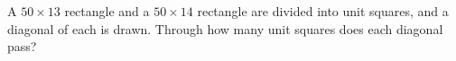 A $50\times13$ rectangle and a $50\times14$ rectangle are divided into unit squares, and a diagonal of each is drawn. Through how many unit squares does each diagonal pass?
